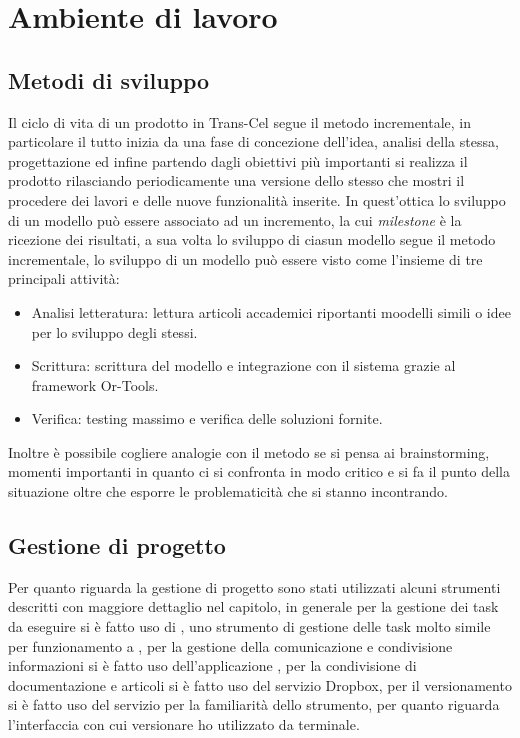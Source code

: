\section{Ambiente di lavoro}
\subsection{Metodi di sviluppo}
Il ciclo di vita di un prodotto in Trans-Cel segue il metodo incrementale, in particolare il tutto inizia da una fase di concezione dell'idea, analisi della stessa, progettazione ed infine partendo dagli obiettivi più importanti si realizza il prodotto rilasciando periodicamente una versione dello stesso che mostri il procedere dei lavori e delle nuove funzionalità inserite. In quest'ottica lo sviluppo di un modello può essere associato ad un incremento, la cui \textit{milestone} è la ricezione dei risultati, a sua volta lo sviluppo di ciasun modello segue il metodo incrementale, lo sviluppo di un modello può essere visto come l'insieme di tre principali attività:
\begin{itemize}
	\item Analisi letteratura: lettura articoli accademici riportanti moodelli simili o idee per lo sviluppo degli stessi.
	\item Scrittura: scrittura del modello e integrazione con il sistema grazie al framework Or-Tools.
	\item Verifica: testing massimo e verifica delle soluzioni fornite.
\end{itemize}
Inoltre è possibile cogliere analogie con il metodo  se si pensa ai brainstorming, momenti importanti in quanto ci si confronta in modo critico e si fa il punto della situazione oltre che esporre le problematicità che si stanno incontrando.

\subsection{Gestione di progetto}
Per quanto riguarda la gestione di progetto sono stati utilizzati alcuni strumenti descritti con maggiore dettaglio nel capitolo, in generale per la gestione dei task da eseguire si è fatto uso di , uno strumento di gestione delle task molto simile per funzionamento a , per la gestione della comunicazione e condivisione informazioni si è fatto uso dell'applicazione , per la condivisione di documentazione e articoli si è fatto uso del servizio Dropbox, per il versionamento si è fatto uso del servizio  per la familiarità dello strumento, per quanto riguarda l'interfaccia con cui versionare ho utilizzato  da terminale.

